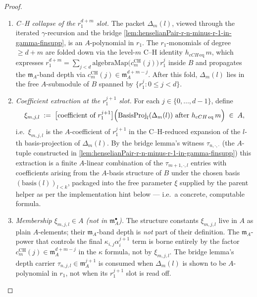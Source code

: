 \begin{proof}
\begin{definition}
\begin{enumerate}
\item \emph{C--H collapse of the $r_1^{d+m}$ slot.} The packet
$\Delta_m(l)$, viewed through the iterated $\gamma$-recursion
and the bridge \cref{lem:henselianPair-r-n-minus-r-1-in-gamma-finsupp},
is an $A$-polynomial in $r_1$. The $r_1$-monomials of degree
$\ge d + m$ are folded down via the level-$m$ C--H identity
$h_{cCH\,\mathrm{eq}}\,m$, which expresses
$r_1^{d+m} = \sum_{j < d} \mathrm{algebraMap}\bigl(c^{\mathrm{CH}}_m(j)\bigr)\, r_1^{j}$
inside $B$ and propagates the $\mathfrak m_A$-band depth via
$c^{\mathrm{CH}}_m(j) \in \mathfrak m_A^{d + m - j}$. After
this fold, $\Delta_m(l)$ lies in the free $A$-submodule of
$B$ spanned by $\{r_1^{j} : 0 \le j < d\}$.

\item \emph{Coefficient extraction at the $r_1^{j+1}$ slot.}
For each $j \in \{0, \ldots, d - 1\}$, define
\[
\xi_{m,j,l} \;:=\; \bigl[\text{coefficient of } r_1^{j+1}\bigr]
\Bigl(\mathrm{BasisProj}_l(\Delta_m(l)) \text{ after } h_{cCH\,\mathrm{eq}}\,m\Bigr)
\;\in\; A,
\]
i.e.\ $\xi_{m,j,l}$ is the $A$-coefficient of $r_1^{j+1}$ in
the C--H-reduced expansion of the $l$-th basis-projection of
$\Delta_m(l)$. By the bridge lemma's witness $\tau_{n, \cdot, \cdot}$
(the $A$-tuple constructed in
\cref{lem:henselianPair-r-n-minus-r-1-in-gamma-finsupp}) this
extraction is a finite $A$-linear combination of the
$\tau_{m+1, \cdot, l}$ entries with coefficients arising from the
$A$-basis structure of $B$ under the chosen basis
$(\mathrm{basis}(l))_{l < k}$, packaged into the free parameter
$\xi$ supplied by the parent helper as per the implementation
hint below --- i.e.\ a concrete, computable formula.

\item \emph{Membership $\xi_{m,j,l} \in A$ (not in
$\mathfrak m_A^{\bullet}$).} The structure constants $\xi_{m,j,l}$
live in $A$ as plain $A$-elements; their $\mathfrak m_A$-band
depth is \emph{not} part of their definition. The
$\mathfrak m_A$-power that controls the final
$\kappa_{i,j} \alpha_i^{j+1}$ term is borne entirely by the
factor $c^{\mathrm{CH}}_m(j) \in \mathfrak m_A^{d + m - j}$
in the $\kappa$ formula, not by $\xi_{m,j,l}$. The bridge
lemma's depth carrier
$\tau_{n,j,l} \in \mathfrak m_A^{j + 1}$ is consumed when
$\Delta_m(l)$ is shown to be $A$-polynomial in $r_1$, not when
its $r_1^{j+1}$ slot is read off.
\end{enumerate}


\end{definition}
\end{proof}
